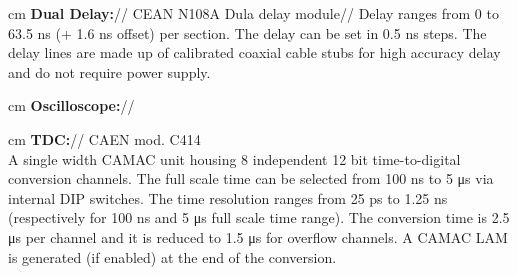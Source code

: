 	 cm
	\textbf{Dual Delay:}// CEAN N108A Dula delay module//
	Delay ranges from 0 to 63.5 ns (+ 1.6 ns offset) per section. The delay can be set in 0.5 ns steps. The delay lines are made up of calibrated coaxial cable stubs for high accuracy delay and do not require power supply.
	
	 cm
	\textbf{Oscilloscope:}//
	
	 cm
	\textbf{TDC:}// CAEN mod. C414\\
	A single width CAMAC unit housing 8 independent 12 bit time-to-digital conversion channels. The full scale time can be selected from 100 ns to 5 μs via internal DIP switches. The time resolution ranges from 25 ps to 1.25 ns (respectively for 100 ns and 5 μs full scale time range). The conversion time is 2.5 μs per channel and it is reduced to 1.5 μs for overflow channels. A CAMAC LAM is generated (if enabled) at the end of the conversion.
